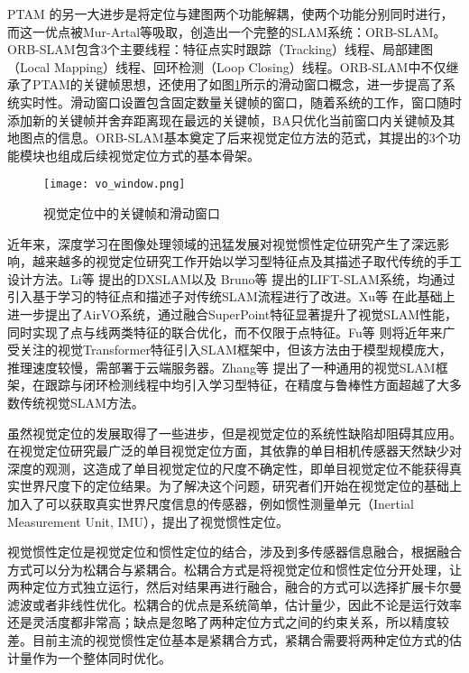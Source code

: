 PTAM 的另一大进步是将定位与建图两个功能解耦，使两个功能分别同时进行，而这一优点被Mur-Artal等\cite{mur2015orb,mur2017orb}吸取，创造出一个完整的SLAM系统：ORB-SLAM。ORB-SLAM包含3个主要线程：特征点实时跟踪（Tracking）线程、局部建图（Local Mapping）线程、回环检测（Loop Closing）线程。ORB-SLAM中不仅继承了PTAM的关键帧思想，还使用了如图\ref{fig:vo_window}所示的滑动窗口概念，进一步提高了系统实时性。滑动窗口设置包含固定数量关键帧的窗口，随着系统的工作，窗口随时添加新的关键帧并舍弃距离现在最远的关键帧，BA只优化当前窗口内关键帧及其地图点的信息。ORB-SLAM基本奠定了后来视觉定位方法的范式，其提出的3个功能模块也组成后续视觉定位方式的基本骨架。

\begin{figure}
  \centering
  \texttt{[image: vo\_window.png]}
  \caption{视觉定位中的关键帧和滑动窗口}
  \label{fig:vo_window}
\end{figure}

近年来，深度学习在图像处理领域的迅猛发展对视觉惯性定位研究产生了深远影响，越来越多的视觉定位研究工作开始以学习型特征点及其描述子取代传统的手工设计方法。Li等\cite{li2020dxslam} 提出的DXSLAM以及 Bruno等\cite{bruno2021lift} 提出的LIFT-SLAM系统，均通过引入基于学习的特征点和描述子对传统SLAM流程进行了改进。Xu等\cite{xu2023airvo} 在此基础上进一步提出了AirVO系统，通过融合SuperPoint\cite{detone2018superpoint}特征显著提升了视觉SLAM性能，同时实现了点与线两类特征的联合优化，而不仅限于点特征。Fu等\cite{fu2024visual} 则将近年来广受关注的视觉Transformer特征引入SLAM框架中，但该方法由于模型规模庞大，推理速度较慢，需部署于云端服务器。Zhang等\cite{xiao2024realtimerobustversatilevisualslam} 提出了一种通用的视觉SLAM框架，在跟踪与闭环检测线程中均引入学习型特征，在精度与鲁棒性方面超越了大多数传统视觉SLAM方法。

虽然视觉定位的发展取得了一些进步，但是视觉定位的系统性缺陷却阻碍其应用。在视觉定位研究最广泛的单目视觉定位方面，其依靠的单目相机传感器天然缺少对深度的观测，这造成了单目视觉定位的尺度不确定性，即单目视觉定位不能获得真实世界尺度下的定位结果。为了解决这个问题，研究者们开始在视觉定位的基础上加入了可以获取真实世界尺度信息的传感器，例如惯性测量单元（Inertial Measurement Unit, IMU），提出了视觉惯性定位。

视觉惯性定位是视觉定位和惯性定位的结合，涉及到多传感器信息融合，根据融合方式可以分为松耦合\cite{aslan2022comprehensive}与紧耦合\cite{zeng2023fast}。松耦合方式是将视觉定位和惯性定位分开处理，让两种定位方式独立运行，然后对结果再进行融合，融合的方式可以选择扩展卡尔曼滤波或者非线性优化。松耦合的优点是系统简单，估计量少，因此不论是运行效率还是灵活度都非常高；缺点是忽略了两种定位方式之间的约束关系，所以精度较差。目前主流的视觉惯性定位基本是紧耦合方式，紧耦合需要将两种定位方式的估计量作为一个整体同时优化。

